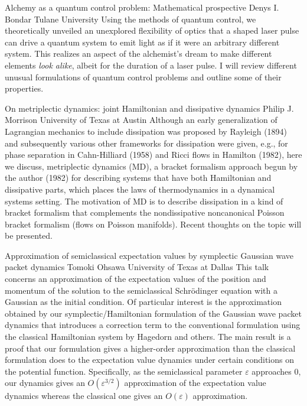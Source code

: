 \begin{addmargin}[2em]{0em}
\abs
{Alchemy as a quantum control problem: Mathematical prospective}
{Denys I. Bondar}
{Tulane University}
{Using the methods of quantum control, we theoretically unveiled an unexplored flexibility of optics that a shaped laser pulse can drive a quantum system to emit light as if it were an arbitrary different system. This realizes an aspect of the alchemist’s dream to make different elements {\it look alike}, albeit for the duration of a laser pulse. I will review different unusual formulations of quantum control problems and outline some of their properties.}

\vspace{1.5ex}
\abs
{On metriplectic dynamics:  joint Hamiltonian and dissipative dynamics}
{Philip J. Morrison}
{University of Texas at Austin}
{Although an early generalization of Lagrangian mechanics to include dissipation was proposed by Rayleigh (1894) and subsequently various other  frameworks for dissipation were given, e.g., for phase separation in Cahn-Hilliard (1958) and Ricci flows in Hamilton (1982),  here we discuss, metriplectic dynamics (MD), a bracket formalism approach begun by the author (1982) for describing systems that have both Hamiltonian and dissipative parts, which places the laws of thermodynamics in a dynamical systems setting.   The motivation of MD is to describe dissipation in a kind of bracket formalism that complements the nondissipative noncanonical Poisson bracket formalism (flows on Poisson manifolds).  Recent thoughts on the topic will be presented.
}


\vspace{1.5ex}
\abs
{Approximation of semiclassical expectation values by symplectic Gaussian wave packet dynamics}
{Tomoki Ohsawa}
{University of Texas at Dallas}
{This talk concerns an approximation of the expectation values of the position and momentum of the solution to the semiclassical Schr\"odinger equation with a Gaussian as the initial condition. Of particular interest is the approximation obtained by our symplectic/Hamiltonian formulation of the Gaussian wave packet dynamics that introduces a correction term to the conventional formulation using the classical Hamiltonian system by Hagedorn and others. The main result is a proof that our formulation gives a higher-order approximation than the classical formulation does to the expectation value dynamics under certain conditions on the potential function. Specifically, as the semiclassical parameter $\varepsilon$ approaches $0$, our dynamics gives an $O(\varepsilon^{3/2})$ approximation of the expectation value dynamics whereas the classical one gives an $O(\varepsilon)$ approximation.}
\end{addmargin}
